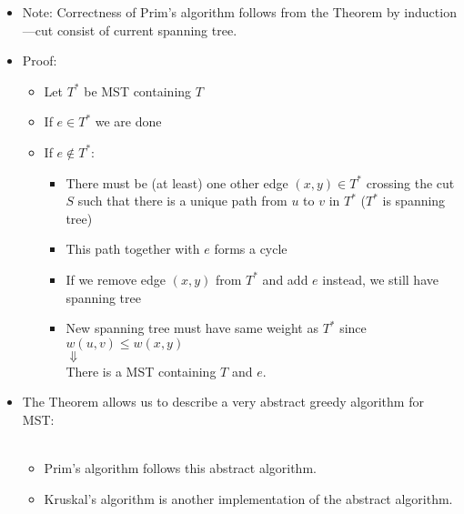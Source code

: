 \documentclass[11pt]{article}
\begin{document}
\begin{itemize}
\item Note: Correctness of Prim's algorithm follows from the Theorem by
  induction---cut consist of current spanning tree.

\item Proof:
  \begin{itemize}
  \item Let $T^*$ be MST containing $T$
  \item If $e \in T^*$ we are done
  \item If $e \notin T^*$:
    \begin{itemize}
    \item There must be (at least) one other edge $(x,y) \in T^*$
      crossing the cut $S$ such that there is a unique path from $u$
      to $v$ in $T^*$ ($T^*$ is spanning tree) \\
      \centerline{}
    \item This path together with $e$ forms a cycle
    \item If we remove edge $(x,y)$ from $T^*$ and add $e$
      instead, we still have spanning tree
    \item New spanning tree must have same weight as $T^*$
      since $w(u,v) \leq w(x,y)$ \\
      $\Downarrow$ \\
      There is a MST containing $T$ and $e$.
    \end{itemize}
  \end{itemize}

\item The Theorem allows us to describe a very abstract greedy algorithm
  for MST: \\ \\
  \begin{itemize}
  \item Prim's algorithm follows this abstract algorithm.
  \item Kruskal's algorithm is another implementation of the abstract
  algorithm.
  \end{itemize}
\end{itemize}
\end{document}
